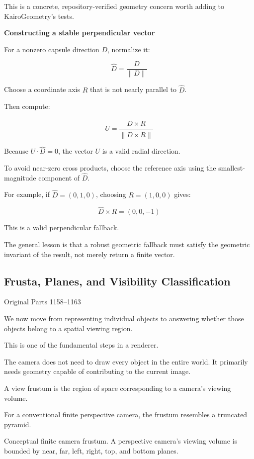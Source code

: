 This is a concrete, repository-verified geometry concern worth adding to KairoGeometry's tests.

\textbf{Constructing a stable perpendicular vector}

For a nonzero capsule direction \(D\), normalize it:

\[
\hat D=\frac{D}{\|D\|}
\]

Choose a coordinate axis \(R\) that is not nearly parallel to \(\hat D\).

Then compute:

\[
U=\frac{\hat D\times R}{\|\hat D\times R\|}
\]

Because \(U\cdot\hat D=0\), the vector \(U\) is a valid radial direction.

To avoid near-zero cross products, choose the reference axis using the smallest-magnitude component of \(\hat D\).

For example, if \(\hat D=(0,1,0)\), choosing \(R=(1,0,0)\) gives:

\[
\hat D\times R=(0,0,-1)
\]

This is a valid perpendicular fallback.

The general lesson is that a robust geometric fallback must satisfy the geometric invariant of the result, not merely return a finite vector.

\subsection{Frusta, Planes, and Visibility Classification}\label{03-visual-computing-i-ch021-frusta-planes-and-visibility-classification}

\hypertarget{03-visual-computing-i-ch021-frusta-planes-and-visibility-classification}{}

Original Parts 1158--1163

We now move from representing individual objects to answering whether those objects belong to a spatial viewing region.

This is one of the fundamental steps in a renderer.

The camera does not need to draw every object in the entire world. It primarily needs geometry capable of contributing to the current image.

A view frustum is the region of space corresponding to a camera's viewing volume.

For a conventional finite perspective camera, the frustum resembles a truncated pyramid.

Conceptual finite camera frustum. A perspective camera's viewing volume is bounded by near, far, left, right, top, and bottom planes.

